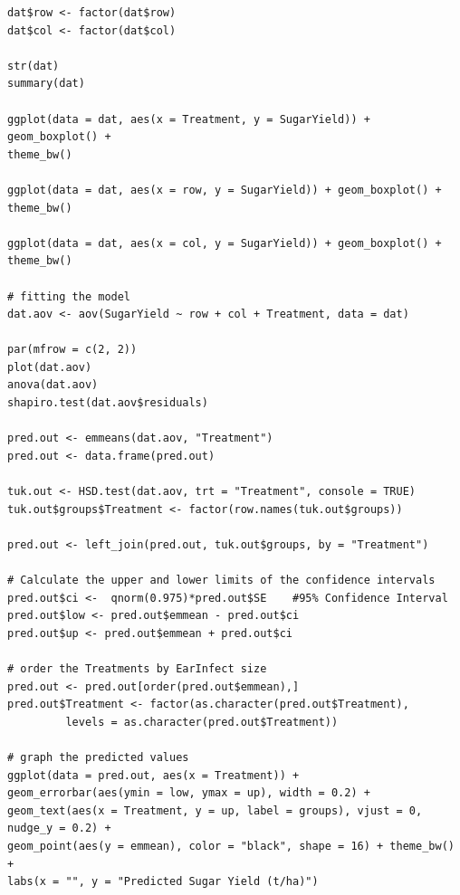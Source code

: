 \documentclass[a4paper, 10pt, fleqn, twosided]{memoir}
\begin{document}
\begin{tcolorbox}[title = Exercise 6 code]
\begin{verbatim}
dat$row <- factor(dat$row)
dat$col <- factor(dat$col)

str(dat)
summary(dat)

ggplot(data = dat, aes(x = Treatment, y = SugarYield)) + geom_boxplot() +
theme_bw()

ggplot(data = dat, aes(x = row, y = SugarYield)) + geom_boxplot() +
theme_bw()

ggplot(data = dat, aes(x = col, y = SugarYield)) + geom_boxplot() +
theme_bw()

# fitting the model
dat.aov <- aov(SugarYield ~ row + col + Treatment, data = dat)

par(mfrow = c(2, 2))
plot(dat.aov)
anova(dat.aov)
shapiro.test(dat.aov$residuals)

pred.out <- emmeans(dat.aov, "Treatment")
pred.out <- data.frame(pred.out)

tuk.out <- HSD.test(dat.aov, trt = "Treatment", console = TRUE)
tuk.out$groups$Treatment <- factor(row.names(tuk.out$groups))

pred.out <- left_join(pred.out, tuk.out$groups, by = "Treatment")

# Calculate the upper and lower limits of the confidence intervals
pred.out$ci <-  qnorm(0.975)*pred.out$SE    #95% Confidence Interval
pred.out$low <- pred.out$emmean - pred.out$ci
pred.out$up <- pred.out$emmean + pred.out$ci

# order the Treatments by EarInfect size
pred.out <- pred.out[order(pred.out$emmean),]
pred.out$Treatment <- factor(as.character(pred.out$Treatment),
         levels = as.character(pred.out$Treatment))
 
# graph the predicted values 
ggplot(data = pred.out, aes(x = Treatment)) +
geom_errorbar(aes(ymin = low, ymax = up), width = 0.2) +
geom_text(aes(x = Treatment, y = up, label = groups), vjust = 0, nudge_y = 0.2) +
geom_point(aes(y = emmean), color = "black", shape = 16) + theme_bw() +
labs(x = "", y = "Predicted Sugar Yield (t/ha)")
\end{verbatim}
\end{tcolorbox}
\end{document}
